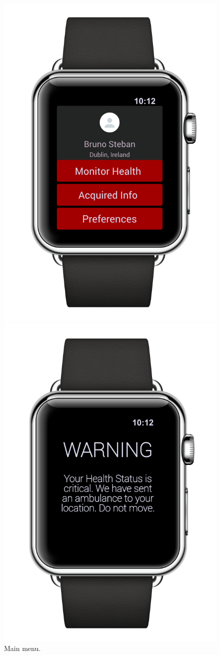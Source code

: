 \begin{enumerate}
\begin{figure}
\begin{center}
\begin{minipage}[c]{.40\textwidth}
          \includegraphics[height=12 cm]{Images/Mockups/AutomatedSOSMockup5.png}
          	\caption{Main menu.}
        \end{minipage}%
        \hspace{10mm}%
        \begin{minipage}[c]{.40\textwidth}
        \centering
          \includegraphics[height=12 cm]{Images/Mockups/AutomatedSOSMockup7.png}

\end{minipage}
\end{center}
\end{figure}
\end{enumerate}
